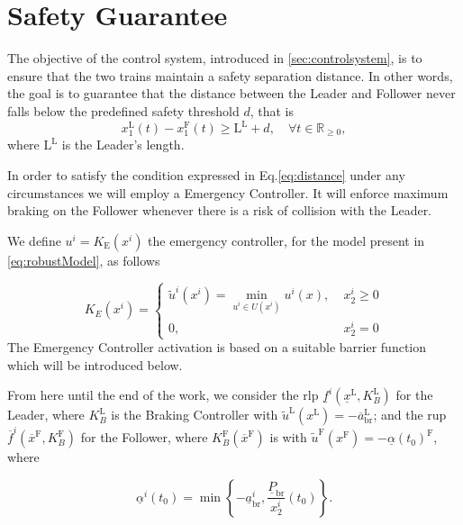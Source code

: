 \section{Safety Guarantee}
\label{sec:SafetyGuarantee}

The objective of the control system, introduced in \ref{sec:controlsystem}, is to ensure that the two trains maintain a safety separation distance. In other words, the goal is to guarantee that the distance between the Leader and Follower never falls below the predefined safety threshold $d$, that is
%
\begin{equation} \label{eq:distance}
	x_1^\mathrm{L}(t) - x_1^\mathrm{F}(t) \geq  \mathrm{L}^\mathrm{L} +d, \quad  \forall  t \in \mathbb{R}_{\geq 0},
\end{equation}
where $\mathrm{L}^\mathrm{L}$ is the Leader's length.

In order to satisfy the condition expressed in Eq.\tildeAdd\eqref{eq:distance} under any circumstances we will employ a Emergency Controller. It will enforce maximum braking on the Follower whenever there is a risk of collision with the Leader. 
%
\begin{definition}
	We define  $u^i= K_\mathrm{E}(x^i)$ the emergency controller, for the model present in \eqref{eq:robustModel}, as follows
\end{definition}
\begin{equation*}
	K_E(x^i)=
	\begin{cases}
		\tilde{u}^i(x^i) =  \min\limits_{u^i \in U(x^i)} u^i(x), \;  &x_2^i \geq 0\\
		0 ,& x_2^i = 0
	\end{cases}       
\end{equation*}
%
The Emergency Controller activation is based on a suitable barrier function which will be introduced below.

From here until the end of the work, we consider the \gls{rlp} $\underline{f}^i(\underline{x}^{\mathrm{L}},K_B^\mathrm{L})$ for the Leader, where $K_B^\mathrm{L}$ is the Braking Controller with $\tilde{u}^\mathrm{L}\left(x^\mathrm{L}\right)= -\overline{a}^\mathrm{L}_\mathrm{br}$; and the \gls{rup} $\overline{f}^i(\overline{x}^{\mathrm{F}},K_B^\mathrm{F})$ for the Follower, where $K_B^\mathrm{F}\left(\overline{x}^\mathrm{F}\right)$ is with $\tilde{u}^\mathrm{F}\left(x^\mathrm{F}\right) = -\underline{\alpha}\left( t_0 \right)^\mathrm{F}$, where

\begin{equation*}
	\underline{\alpha}^i \left( t_0 \right)=\min \left\{-\underline{a}^i_\mathrm{br},\frac{\underline{P}_\mathrm{br}}{x_2^i}\left( t_0 \right) \right\}.
\end{equation*}



